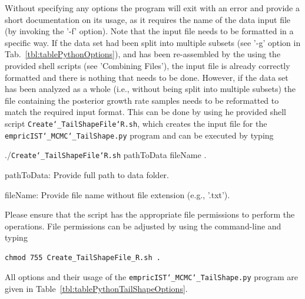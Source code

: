 \documentclass[12pt,a4paper]{scrartcl}
\begin{document}
Without specifying any options the program will exit with an error and provide a short documentation on its usage, as it requires the name of the data input file (by invoking the '-f' option). 
Note that the input file needs to be formatted in a specific way. If the data set had been split into multiple subsets (see '-g' option in Tab.~\ref{tbl:tablePythonOptions}), and has been re-assembled by the using the provided shell scripts (see 'Combining Files'), the input file is already correctly formatted and there is nothing that needs to be done. However, if the data set has been analyzed as a whole (i.e., without being split into multiple subsets) the file containing the posterior growth rate samples needs to be reformatted to match the required input format.
This can be done by using he provided shell script \texttt{Create\char`_TailShapeFile\char`R.sh}, which creates the input file for the \texttt{empricIST\char`_MCMC\char`_TailShape.py} program and can be executed by typing 

\vspace{0.05cm}
./\texttt{Create\char`_TailShapeFile\char`R.sh} pathToData fileName .
\vspace{0.05cm}

pathToData: Provide full path to data folder.
\vspace{0.05cm}

fileName: Provide file name without file extension (e.g., '.txt').
\vspace{0.05cm}

Please ensure that the script has the appropriate file permissions to perform the operations. File permissions can be adjusted by using the command-line and typing
\begin{lstlisting}[breaklines=true]
chmod 755 Create_TailShapeFile_R.sh .
\end{lstlisting}

All options and their usage of the \texttt{empricIST\char`_MCMC\char`_TailShape.py} program are given in Table~\ref{tbl:tablePythonTailShapeOptions}.
\end{document}
